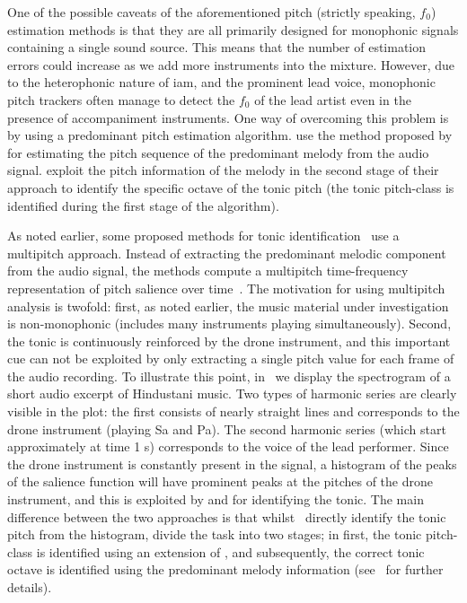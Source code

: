 One of the possible caveats of the aforementioned pitch (strictly speaking, $f_0$) estimation methods is that they are all primarily designed for monophonic signals containing a single sound source. This means that the number of estimation errors could increase as we add more instruments into the mixture. However, due to the heterophonic nature of \gls{iam}, and the prominent lead voice, monophonic pitch trackers often manage to detect the $f_0$ of the lead artist even in the presence of accompaniment instruments. One way of overcoming this problem is by using a predominant pitch estimation algorithm. \cite{gulati2012two} use the method proposed by~\cite{Salamon2012} for estimating the pitch sequence of the predominant melody from the audio signal. \cite{gulati2012two} exploit the pitch information of the melody in the second stage of their approach to identify the specific octave of the tonic pitch (the tonic pitch-class is identified during the first stage of the algorithm).

As noted earlier, some proposed methods for tonic identification~\citep{salamon2012multipitch,gulati2012two} use a multipitch approach. Instead of extracting the predominant melodic component from the audio signal, the methods compute a multipitch time-frequency representation of pitch salience over time~\citep{Salamon2011}. The motivation for using multipitch analysis is twofold: first, as noted earlier, the music material under investigation is non-monophonic (includes many instruments playing simultaneously). Second, the tonic is continuously reinforced by the drone instrument, and this important cue can not be exploited by only extracting a single pitch value for each frame of the audio recording. To illustrate this point, in~ we display the spectrogram of a short audio excerpt of Hindustani music. Two types of harmonic series are clearly visible in the plot: the first consists of nearly straight lines and corresponds to the drone instrument (playing Sa and Pa). The second harmonic series (which start approximately at time 1 s) corresponds to the voice of the lead performer. Since the drone instrument is constantly present in the signal, a histogram of the peaks of the salience function will have prominent peaks at the pitches of the drone instrument, and this is exploited by \cite{salamon2012multipitch} and \cite{gulati2012two} for identifying the tonic. The main difference between the two approaches is that whilst~\cite{salamon2012multipitch} directly identify the tonic pitch from the histogram, \cite{gulati2012two} divide the task into two stages; in first, the tonic pitch-class is identified using an extension of \cite{salamon2012multipitch}, and subsequently, the correct tonic octave is identified using the predominant melody information (see~\cite{Gulati2014Tonic} for further details).

